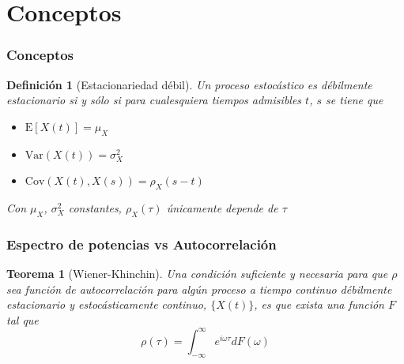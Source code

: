 \documentclass[11pt]{beamer}
\newtheorem{defn}{Definici\'on}
\newtheorem{thrm}{Teorema}
\newcommand{\R}{\mathbb{R}}
\newcommand{\intR}{\int_{-\infty}^{\infty}}
\newcommand{\E}[1]{\mathrm{E}\left[ #1 \right]}
\newcommand{\Var}[1]{\mathrm{Var}\left( #1 \right)}
\newcommand{\Cov}[1]{\mathrm{Cov}\left( #1 \right)}
\begin{document}
\section{Conceptos}

\begin{frame}\frametitle{Conceptos}
\begin{defn}[Estacionariedad d\'ebil]
Un proceso estoc\'astico es d\'ebilmente estacionario si y s\'olo si para cualesquiera tiempos 
admisibles $t$, $s$ se tiene que
\begin{itemize}
\item $\E{X(t)} = \mu_X$
\item $\Var{X(t)} = \sigma^{2}_X$
\item $\Cov{X(t),X(s)} = \rho_X (s-t)$
\end{itemize}
Con $\mu_X$, $\sigma^{2}_X$ constantes, $\rho_X(\tau)$ \'unicamente depende de $\tau$
\end{defn}
\end{frame}




\begin{frame}\frametitle{Espectro de potencias vs Autocorrelaci\'on}
\begin{thrm}[Wiener-Khinchin]
Una condici\'on suficiente y necesaria para que $\rho$ sea funci\'on de autocorrelaci\'on para 
alg\'un proceso a tiempo continuo d\'ebilmente estacionario y estoc\'asticamente continuo, 
$\{X(t)\}$,  es que exista una funci\'on $F$ tal que
\begin{equation*}
\rho(\tau) = \intR e^{i \omega \tau} dF(\omega)
\end{equation*}
\end{thrm}
\end{frame}
\end{document}
